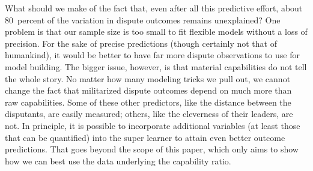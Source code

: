 What should we make of the fact that, even after all this predictive effort, about 80~percent of the variation in dispute outcomes remains unexplained?
One problem is that our sample size is too small to fit flexible models without a loss of precision.
For the sake of precise predictions (though certainly not that of humankind), it would be better to have far more dispute observations to use for model building.
The bigger issue, however, is that material capabilities do not tell the whole story.
No matter how many modeling tricks we pull out, we cannot change the fact that militarized dispute outcomes depend on much more than raw capabilities.
Some of these other predictors, like the distance between the disputants, are easily measured; others, like the cleverness of their leaders, are not.
In principle, it is possible to incorporate additional variables (at least those that can be quantified) into the super learner to attain even better outcome predictions.
That goes beyond the scope of this paper, which only aims to show how we can best use the data underlying the capability ratio.

